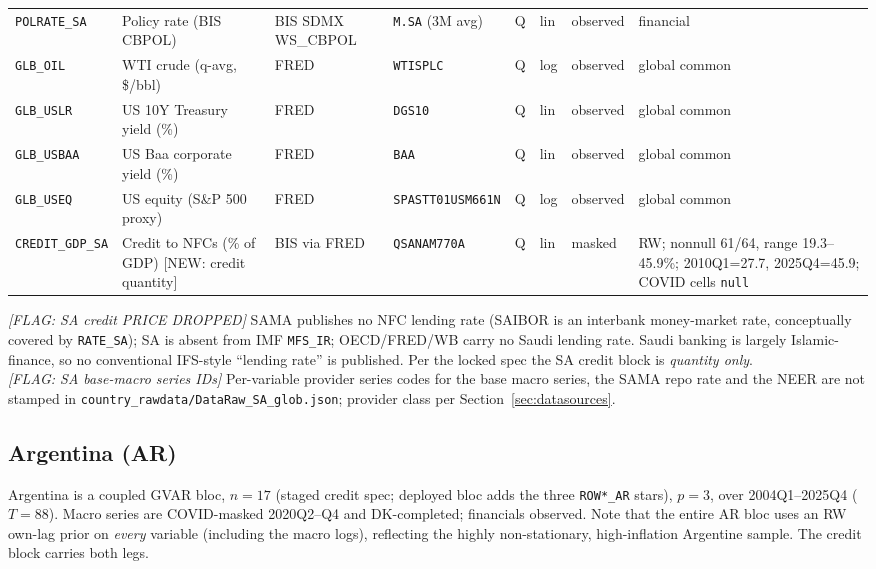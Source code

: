 {\begin{longtable}{p{2.3cm}p{3.3cm}p{2.1cm}p{2.2cm}p{0.6cm}p{1.4cm}p{1.9cm}p{2.4cm}}
\texttt{POLRATE\_SA}& Policy rate (BIS CBPOL)            & BIS SDMX WS\_CBPOL & \texttt{M.SA} (3M avg) & Q & lin & observed & financial \\
\texttt{GLB\_OIL}   & WTI crude (q-avg, \$/bbl)          & FRED & \texttt{WTISPLC} & Q & log & observed & global common \\
\texttt{GLB\_USLR}  & US 10Y Treasury yield (\%)         & FRED & \texttt{DGS10} & Q & lin & observed & global common \\
\texttt{GLB\_USBAA} & US Baa corporate yield (\%)        & FRED & \texttt{BAA} & Q & lin & observed & global common \\
\texttt{GLB\_USEQ}  & US equity (S\&P 500 proxy)         & FRED & \texttt{SPASTT01USM661N} & Q & log & observed & global common \\
\texttt{CREDIT\_GDP\_SA} & Credit to NFCs (\% of GDP) [NEW: credit quantity] & BIS via FRED & \texttt{QSANAM770A} & Q & lin & masked & RW; nonnull 61/64, range 19.3--45.9\%; 2010Q1=27.7, 2025Q4=45.9; COVID cells \texttt{null} \\
\end{longtable}}

\noindent\textit{[FLAG: SA credit PRICE DROPPED]} SAMA publishes no NFC lending
rate (SAIBOR is an interbank money-market rate, conceptually covered by
\texttt{RATE\_SA}); SA is absent from IMF \texttt{MFS\_IR}; OECD/FRED/WB carry no
Saudi lending rate. Saudi banking is largely Islamic-finance, so no conventional
IFS-style ``lending rate'' is published. Per the locked spec the SA credit block
is \emph{quantity only}.\\
\textit{[FLAG: SA base-macro series IDs]} Per-variable provider series codes for
the base macro series, the SAMA repo rate and the NEER are not stamped in
\texttt{country\_rawdata/DataRaw\_SA\_glob.json}; provider class per
Section~\ref{sec:datasources}.

\subsection{Argentina (AR)}\label{sec:data:AR}

Argentina is a coupled GVAR bloc, $n=17$ (staged credit spec; deployed bloc adds
the three \texttt{ROW*\_AR} stars), $p=3$, over 2004Q1--2025Q4 ($T=88$). Macro
series are COVID-masked 2020Q2--Q4 and DK-completed; financials observed. Note
that the entire AR bloc uses an RW own-lag prior on \emph{every} variable
(including the macro logs), reflecting the highly non-stationary, high-inflation
Argentine sample. The credit block carries both legs.

